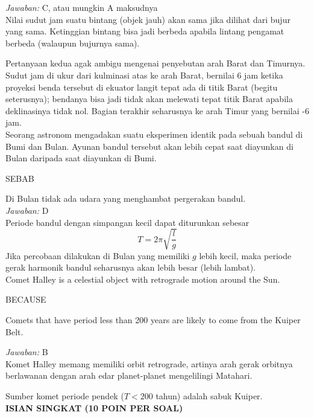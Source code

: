 \documentclass[11pt,fleqn]{exam}
\begin{document}
\begin{questions}
\textit{Jawaban: } C, atau mungkin A maksudnya\\

Nilai sudut jam suatu bintang (objek jauh) akan sama jika dilihat dari bujur yang sama. Ketinggian bintang bisa jadi berbeda apabila lintang pengamat berbeda (walaupun bujurnya sama).

Pertanyaan kedua agak ambigu mengenai penyebutan arah Barat dan Timurnya. Sudut jam di ukur dari kulminasi atas ke arah Barat, bernilai 6 jam ketika proyeksi benda tersebut di ekuator langit tepat ada di titik Barat (begitu seterusnya); bendanya bisa jadi tidak akan melewati tepat titik Barat apabila deklinasinya tidak nol. Bagian terakhir seharusnya ke arah Timur yang bernilai -6 jam.\\


\question Seorang astronom mengadakan suatu eksperimen identik pada sebuah bandul di Bumi dan Bulan. Ayunan bandul tersebut akan lebih cepat saat diayunkan di Bulan daripada saat diayunkan di Bumi.
\begin{center}
SEBAB
\end{center}
Di Bulan tidak ada udara yang menghambat pergerakan bandul.\\

\textit{Jawaban: } D\\

Periode bandul dengan simpangan kecil dapat diturunkan sebesar
\begin{equation*}
T = 2 \pi \sqrt{\frac{l}{g}}
\end{equation*}
Jika percobaan dilakukan di Bulan yang memiliki $g$ lebih kecil, maka periode gerak harmonik bandul seharusnya akan lebih besar (lebih lambat).\\


\question Comet Halley is a celestial object with retrograde motion around the Sun.
\begin{center}
BECAUSE
\end{center}
Comets that have period less than 200 years are likely to come from the Kuiper Belt.

\textit{Jawaban: } B\\

Komet Halley memang memiliki orbit retrograde, artinya arah gerak orbitnya berlawanan dengan arah edar planet-planet mengelilingi Matahari.

Sumber komet periode pendek ($T < 200$ tahun) adalah sabuk Kuiper.\\

\vspace{0.5cm}
\textbf{ISIAN SINGKAT (10 POIN PER SOAL)}


\end{questions}
\end{document}
